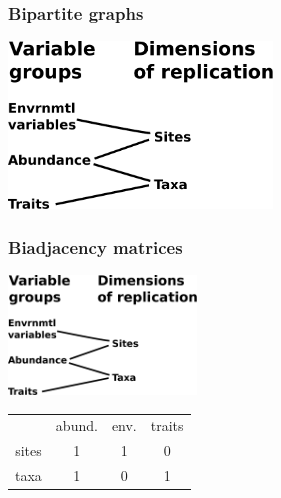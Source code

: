 \documentclass{beamer}
\numberwithin{exercise}{section}
\begin{document}
\begin{frame}
\frametitle{Bipartite graphs}
\begin{center}
\includegraphics[width=7cm]{bipartiteFC}
\end{center}
\end{frame}

%

\begin{frame}
\frametitle{Biadjacency matrices}
\begin{flushleft}
\includegraphics[width=5cm]{bipartiteFC}
\begin{tabular}{cccc}
& abund. & env. & traits \\ 
sites & 1  &  1 & 0 \\
taxa & 1  &  0 & 1 \\
\end{tabular}
\end{flushleft}
\end{frame}
\end{document}
